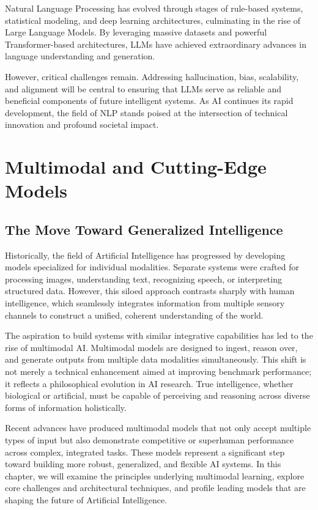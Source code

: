 \documentclass[openany]{book}
\begin{document}
Natural Language Processing has evolved through stages of rule-based systems, 
statistical modeling, and deep learning architectures, culminating in the rise 
of Large Language Models. By leveraging massive datasets and powerful 
Transformer-based architectures, LLMs have achieved extraordinary advances in 
language understanding and generation.

However, critical challenges remain. Addressing hallucination, bias, 
scalability, and alignment will be central to ensuring that LLMs serve as 
reliable and beneficial components of future intelligent systems. As AI 
continues its rapid development, the field of NLP stands poised at the 
intersection of technical innovation and profound societal impact.

\chapter{Multimodal and Cutting-Edge Models}

\section{The Move Toward Generalized Intelligence}

Historically, the field of Artificial Intelligence has progressed by developing 
models specialized for individual modalities. Separate systems were crafted for 
processing images, understanding text, recognizing speech, or interpreting 
structured data. However, this siloed approach contrasts sharply with human 
intelligence, which seamlessly integrates information from multiple sensory 
channels to construct a unified, coherent understanding of the world.

The aspiration to build systems with similar integrative capabilities has led to 
the rise of multimodal AI. Multimodal models are designed to ingest, reason over, 
and generate outputs from multiple data modalities simultaneously. This shift is 
not merely a technical enhancement aimed at improving benchmark performance; it 
reflects a philosophical evolution in AI research. True intelligence, whether 
biological or artificial, must be capable of perceiving and reasoning across 
diverse forms of information holistically.

Recent advances have produced multimodal models that not only accept multiple 
types of input but also demonstrate competitive or superhuman performance across 
complex, integrated tasks. These models represent a significant step toward 
building more robust, generalized, and flexible AI systems. In this chapter, we 
will examine the principles underlying multimodal learning, explore core 
challenges and architectural techniques, and profile leading models that are 
shaping the future of Artificial Intelligence.
\end{document}
